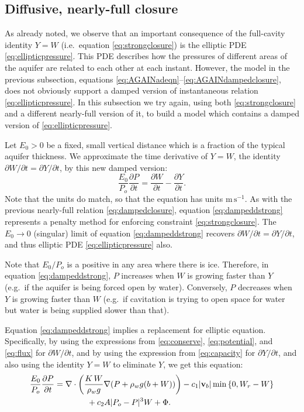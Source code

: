 \documentclass[12pt,final]{amsart}%
\newcommand\bv{\mathbf{v}}
\newcommand{\Div}{\nabla\cdot}
\newcommand{\grad}{\nabla}
\begin{document}
\subsection*{Diffusive, nearly-full closure}  As already noted, we observe that an important consequence of the full-cavity identity $Y=W$ (i.e.~equation \eqref{eq:strongclosure}) is the elliptic PDE \eqref{eq:ellipticpressure}.  This PDE describes how the pressures of different areas of the aquifer are related to each other at each instant.  However, the model in the previous subsection, equations \eqref{eq:AGAINadeqn}--\eqref{eq:AGAINdampedclosure}, does not obviously support a damped version of instantaneous relation \eqref{eq:ellipticpressure}.  In this subsection we try again, using both \eqref{eq:strongclosure} and a different nearly-full version of it, to build a model which contains a damped version of \eqref{eq:ellipticpressure}.

Let $E_0>0$ be a fixed, small vertical distance which is a fraction of the typical aquifer thickness.  We approximate the time derivative of $Y=W$, the identity $\partial W/\partial t = \partial Y/\partial t$, by this new damped version:
\begin{equation}
\frac{E_0}{P_o} \frac{\partial P}{\partial t} =  \frac{\partial W}{\partial t}  - \frac{\partial Y}{\partial t}.\label{eq:dampeddstrong}
\end{equation}
Note that the units do match, so that the equation has units $\text{m}\,\text{s}^{-1}$.  As with the previous nearly-full relation \eqref{eq:dampedclosure}, equation \eqref{eq:dampeddstrong} represents a penalty method for enforcing constraint \eqref{eq:strongclosure}.  The $E_0\to 0$ (singular) limit of equation \eqref{eq:dampeddstrong} recovers $\partial W/\partial t = \partial Y/\partial t$, and thus elliptic PDE \eqref{eq:ellipticpressure} also.

Note that $E_0/P_o$ is a positive in any area where there is ice.  Therefore, in equation \eqref{eq:dampeddstrong}, $P$ increases when $W$ is growing faster than $Y$ (e.g.~if the aquifer is being forced open by water).  Conversely, $P$ decreases when $Y$ is growing faster than $W$ (e.g.~if cavitation is trying to open space for water but water is being supplied slower than that).

Equation \eqref{eq:dampeddstrong} implies a replacement for elliptic equation.  Specifically, by using the expressions from \eqref{eq:conserve}, \eqref{eq:potential}, and \eqref{eq:flux} for $\partial W/\partial t$, and by using the expression from \eqref{eq:capacity} for $\partial Y/\partial t$, and also using the identity $Y=W$ to eliminate $Y$, we get this equation:
\begin{align}
\frac{E_0}{P_o} \frac{\partial P}{\partial t} &= \Div \left(\frac{K\,W}{\rho_w g} \grad (P+\rho_w g (b+W))\right) - c_1 |\bv_b| \min\left\{0,W_r - W\right\} \label{eq:diffusionpressure} \\
  &\qquad\qquad + c_2 A |P_o - P|^3 W  + \Phi. \notag
\end{align}
\end{document}
